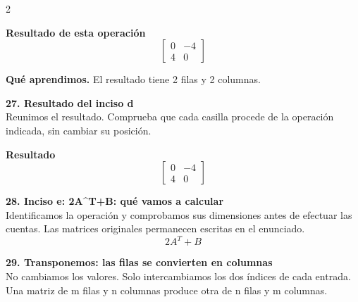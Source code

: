 \documentclass[11pt,a4paper,landscape]{article}
\begin{document}
\begin{multicols*}{2}
\begin{minipage}{\linewidth}
\par{}\par\smallskip
\par\smallskip \textbf{Resultado de esta operación}\[\begin{bmatrix}0 & -4\\4 & 0\end{bmatrix}\]
\par\smallskip\textbf{Qué aprendimos.} El resultado tiene 2 filas y 2 columnas.
\end{minipage}\par\medskip
\noindent\begin{minipage}{\linewidth}\textbf{27. Resultado del inciso d}\\[2pt]Reunimos el resultado. Comprueba que cada casilla procede de la operación indicada, sin cambiar su posición.
\par\smallskip \textbf{Resultado}\[\begin{bmatrix}0 & -4\\4 & 0\end{bmatrix}\]
\end{minipage}\par\medskip
\noindent\begin{minipage}{\linewidth}\textbf{28. Inciso e: 2A\textasciicircum{}T+B: qué vamos a calcular}\\[2pt]Identificamos la operación y comprobamos sus dimensiones antes de efectuar las cuentas. Las matrices originales permanecen escritas en el enunciado.
\[2A^T+B\]
\end{minipage}\par\medskip
\noindent\begin{minipage}{\linewidth}\textbf{29. Transponemos: las filas se convierten en columnas}\\[2pt]No cambiamos los valores. Solo intercambiamos los dos índices de cada entrada. Una matriz de m filas y n columnas produce otra de n filas y m columnas.

\end{minipage}
\end{multicols*}
\end{document}
